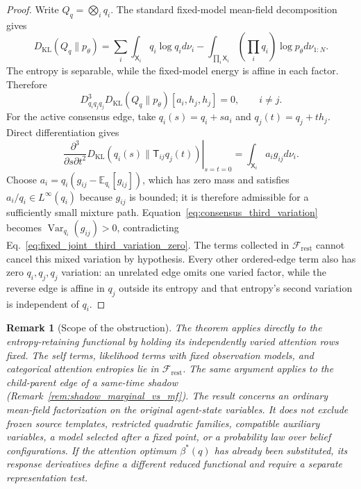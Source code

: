 \documentclass[11pt]{article}
\newtheorem{remark}{Remark}
\begin{document}
\begin{proof}
Write $Q_q=\bigotimes_iq_i$. The standard fixed-model mean-field decomposition~\cite{Wainwright2008} gives
\begin{equation}
D_{\mathrm{KL}}(Q_q\|p_\theta)
=\sum_i\int_{\mathsf{X}_i}q_i\log q_i d\nu_i
-\int_{\prod_i\mathsf{X}_i}\left(\prod_iq_i\right)\log p_\theta d\nu_{1:N}.
\label{eq:fixed_joint_mean_field_structure}
\end{equation}
The entropy is separable, while the fixed-model energy is affine in each factor. Therefore
\begin{equation}
D^3_{q_iq_jq_j}D_{\mathrm{KL}}(Q_q\|p_\theta)[a_i,h_j,h_j]=0,
\qquad i\ne j.
\label{eq:fixed_joint_third_variation_zero}
\end{equation}
For the active consensus edge, take $q_i(s)=q_i+s a_i$ and $q_j(t)=q_j+t h_j$. Direct differentiation gives
\begin{equation}
\left.
\frac{\partial^3}{\partial s\partial t^2}
D_{\mathrm{KL}}(q_i(s)\|\mathsf{T}_{ij}q_j(t))
\right|_{s=t=0}
=\int_{\mathsf{X}_i}a_i g_{ij}d\nu_i.
\label{eq:consensus_third_variation}
\end{equation}
Choose $a_i=q_i(g_{ij}-\mathbb{E}_{q_i}[g_{ij}])$, which has zero mass and satisfies $a_i/q_i\in L^\infty(q_i)$ because $g_{ij}$ is bounded; it is therefore admissible for a sufficiently small mixture path. Equation~\eqref{eq:consensus_third_variation} becomes $\operatorname{Var}_{q_i}(g_{ij})>0$, contradicting Eq.~\eqref{eq:fixed_joint_third_variation_zero}. The terms collected in $\mathcal{F}_{\mathrm{rest}}$ cannot cancel this mixed variation by hypothesis. Every other ordered-edge term also has zero $q_i,q_j,q_j$ variation: an unrelated edge omits one varied factor, while the reverse edge is affine in $q_j$ outside its entropy and that entropy's second variation is independent of $q_i$.
\end{proof}

\begin{remark}[Scope of the obstruction]
\label{rem:state_level_elbo_nogo_scope}
The theorem applies directly to the entropy-retaining functional by holding its independently varied attention rows fixed. The self terms, likelihood terms with fixed observation models, and categorical attention entropies lie in $\mathcal{F}_{\mathrm{rest}}$. The same argument applies to the child-parent edge of a same-time shadow (Remark~\ref{rem:shadow_marginal_vs_mf}). The result concerns an ordinary mean-field factorization on the original agent-state variables. It does not exclude frozen source templates, restricted quadratic families, compatible auxiliary variables, a model selected after a fixed point, or a probability law over belief configurations. If the attention optimum $\beta^*(q)$ has already been substituted, its response derivatives define a different reduced functional and require a separate representation test.
\end{remark}
\end{document}
